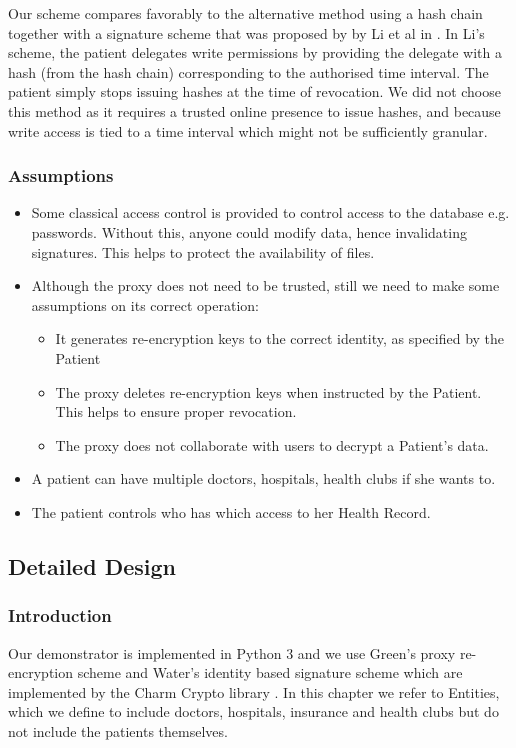 \documentclass[]{article}
\begin{document}
Our scheme compares favorably to the alternative method using a hash chain together with a signature scheme that was proposed by by Li et al in \cite{li2013scalable}. In Li's scheme, the patient delegates write permissions by providing the delegate with a hash (from the hash chain) corresponding to the authorised time interval. The patient simply stops issuing hashes at the time of revocation. We did not choose this method as it requires a trusted online presence to issue hashes, and because write access is tied to a time interval which might not be sufficiently granular.

\subsubsection{Assumptions}
\begin{itemize}
\item Some classical access control is provided to control access to the database e.g. passwords. Without this, anyone could modify data, hence invalidating signatures. This helps to protect the availability of files.
\item Although the proxy does not need to be trusted, still we need to make some assumptions on its correct operation:
\begin{itemize}
\item It generates re-encryption keys to the correct identity, as specified by the Patient
\item The proxy deletes re-encryption keys when instructed by the Patient. This helps to ensure proper revocation.
\item The proxy does not collaborate with users to decrypt a Patient's data.
\end{itemize}
\item A patient can have multiple doctors, hospitals, health clubs if she wants to.
\item The patient controls who has which access to her Health Record.
\end{itemize}

\subsection{Detailed Design}
\subsubsection{Introduction}
Our demonstrator is implemented in Python 3 and we use Green's proxy re-encryption scheme \cite{green2007identity} and Water's identity based signature scheme \cite{waters2005efficient} which are implemented by the Charm Crypto library \cite{charm13}. In this chapter we refer to Entities, which we define to include doctors, hospitals, insurance and health clubs but do not include the patients themselves.
\end{document}
